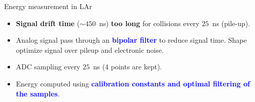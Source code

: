 \begin{frame}{Energy measurement in LAr}
  \begin{minipage}{0.3\linewidth}
\end{minipage}
\hfill
\begin{minipage}{0.69\linewidth}
\begin{itemize}
\item {\bf Signal drift time }($\sim 450$~ns) {\bf too long} for collisions every $25$~ns (pile-up).
\item Analog signal pass through an \textcolor{blue}{\bf bipolar filter } to reduce signal time.
Shape optimize signal over pileup and electronic noise.
\item ADC sampling every $25$~ns (4 points are kept).
\item Energy computed using \textcolor{blue}{\bf calibration constants and optimal filtering of the samples}.
\end{itemize}
\end{minipage}
\begin{center}


\end{center}

\end{frame}

